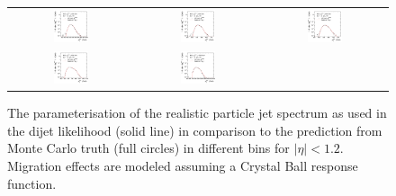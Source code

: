 \begin{figure}[ht]
\begin{tabular}{ccc}
    \includegraphics[width=0.3\textwidth]{figures/ResFit_Spring10QCDFlat_CB_Eta0_Spectrum_PtBin6} &
    \includegraphics[width=0.3\textwidth]{figures/ResFit_Spring10QCDFlat_CB_Eta0_Spectrum_PtBin7} &
    \includegraphics[width=0.3\textwidth]{figures/ResFit_Spring10QCDFlat_CB_Eta0_Spectrum_PtBin8} \\

    \includegraphics[width=0.3\textwidth]{figures/ResFit_Spring10QCDFlat_CB_Eta0_Spectrum_PtBin9} &
    \includegraphics[width=0.3\textwidth]{figures/ResFit_Spring10QCDFlat_CB_Eta0_Spectrum_PtBin10} & \\
  \end{tabular}
\caption{The parameterisation of the realistic particle jet \pt spectrum as used in the dijet likelihood (solid line) in comparison to the prediction from Monte Carlo truth (full circles) in different \pt bins for \mbox{$|\eta|<1.2$}. Migration effects are modeled assuming a Crystal Ball response function.}
\label{fig:ResFit:App:CB:Spectrum}
\end{figure}


